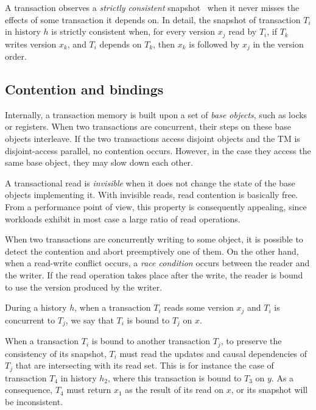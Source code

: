 A transaction observes a \emph{strictly consistent} snapshot~\cite{cc:coh:997} when it never misses the effects of some transaction it depends on.
In detail, the snapshot of transaction $T_i$ in history $h$ is strictly consistent when, for every version $x_j$ read by $T_i$, if $T_k$ writes version $x_k$, and $T_i$ depends on $T_{k}$, then $x_k$ is followed by $x_j$ in the version order.

\subsection{Contention and bindings}

Internally, a transaction memory is built upon a set of \emph{base objects}, such as locks or registers.
When two transactions are concurrent, their steps on these base objects interleave.
If the two transactions access disjoint objects and the TM is disjoint-access parallel, no contention occurs.
However, in the case they access the same base object, they may slow down each other.

A transactional read is \emph{invisible} when it does not change the state of the base objects implementing it.
With invisible reads, read contention is basically free.
From a performance point of view, this property is consequently appealing, since workloads exhibit in most case a large ratio of read operations.

When two transactions are concurrently writing to some object, it is possible to detect the contention and abort preemptively one of them.
On the other hand, when a read-write conflict occurs, a \emph{race condition} occurs between the reader and the writer.
If the read operation takes place after the write, the reader is bound to use the version produced by the writer.

\begin{definition}[Binding]
  During a history $h$, when a transaction $T_i$ reads some version $x_j$ and $T_i$ is concurrent to $T_j$, we say that $T_i$ is bound to $T_j$ on $x$.
\end{definition}

When a transaction $T_i$ is bound to another transaction $T_j$, to preserve the consistency of its snapshot, $T_i$ must read the updates and causal dependencies of $T_j$ that are intersecting with its read set.
This is for instance the case of transaction $T_4$ in history $h_2$, where this transaction is bound to $T_3$ on $y$.
As a consequence, $T_4$ must return $x_1$ as the result of its read on $x$, or its snapshot will be inconsistent.

